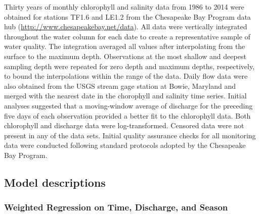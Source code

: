 \documentclass[letterpaper,12pt,oneside]{article}\usepackage[]{graphicx}\usepackage[]{color}
\begin{document}
Thirty years of monthly chlorophyll and salinity data from 1986 to 2014 were obtained for stations TF1.6 and LE1.2 from the Chesapeake Bay Program data hub (\href{http://www.chesapeakebay.net/data}{http://www.chesapeakebay.net/data}).  All data were vertically integrated throughout the water column for each date to create a representative sample of water quality.  The integration averaged all values after interpolating from the surface to the maximum depth. Observations at the most shallow and deepest sampling depth were repeated for zero depth and maximum depths, respectively, to bound the interpolations within the range of the data.  Daily flow data were also obtained from the \ac{USGS} stream gage station at Bowie, Maryland and merged with the nearest date in the chorophyll and salinity time series.  Initial analyses suggested that a moving-window average of discharge for the preceding five days of each observation provided a better fit to the chlorophyll data.  Both chlorophyll and discharge data were log-transformed.  Censored data were not present in any of the data sets.  Initial quality assurance checks for all monitoring data were conducted following standard protocols adopted by the Chesapeake Bay Program.        

\subsection{Model descriptions}


\subsubsection{Weighted Regression on Time, Discharge, and Season}
\end{document}

